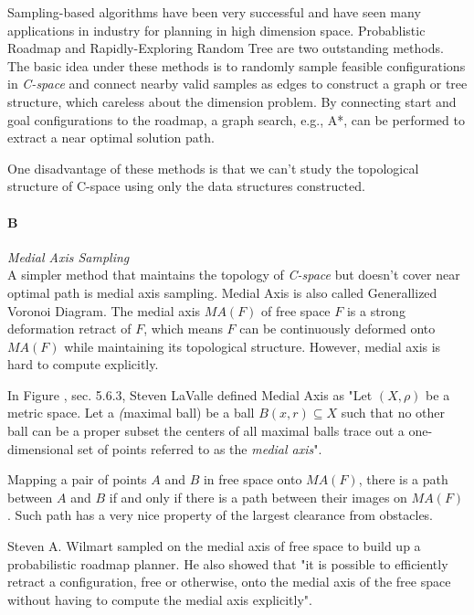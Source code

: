 \documentclass[11pt]{article}
\begin{document}
\indent Sampling-based algorithms have been very successful and have seen many applications in industry for planning in high dimension space. Probablistic Roadmap \cite{PRM} and Rapidly-Exploring Random Tree \cite{RRT} are two outstanding methods. The basic idea under these methods is to randomly sample feasible configurations in \emph{C-space} and connect nearby valid samples as edges to construct a graph or tree structure, which careless about the dimension problem. By connecting start and goal configurations to the roadmap, a graph search, e.g., A*, can be performed to extract a near optimal solution path.

\indent One disadvantage of these methods is that we can't study the topological structure of C-space using only the data structures constructed.

\paragraph{B} \emph{Medial Axis Sampling} \hfill \\
\indent A simpler method that maintains the topology of \emph{C-space} but doesn't cover near optimal path is medial axis sampling. Medial Axis is also called Generallized Voronoi Diagram. The medial axis $MA(F)$ of free space $F$ is a strong deformation retract of $F$, which means $F$ can be continuously deformed onto $MA(F)$ while maintaining its topological structure. However, medial axis is hard to compute explicitly.

\indent In Figure \cite{Book}, sec. 5.6.3, Steven LaValle defined Medial Axis as "Let $(X, \rho)$ be a metric space. Let a \emph(maximal ball) be a ball $B(x,r) \subseteq X$ such that no other ball can be a proper subset the centers of all maximal balls trace out a one-dimensional set of points referred to as the \emph{medial axis}".  

\indent Mapping a pair of points $A$ and $B$ in free space onto $MA(F)$, there is a path between $A$ and $B$ if and only if there is a path between their images on $MA(F)$. Such path has a very nice property of the largest clearance from obstacles.

\indent Steven A. Wilmart \cite{MAPRM} sampled on the medial axis of free space to build up a probabilistic roadmap planner. He also showed that "it is possible to efficiently retract a configuration, free or otherwise, onto the medial axis of the free space without having to compute the medial axis explicitly".
\end{document}
